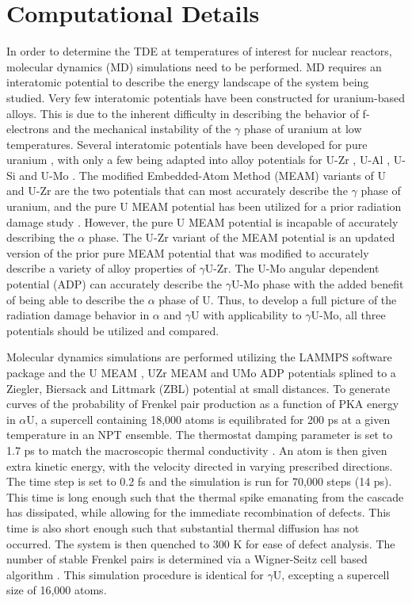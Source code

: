 \documentclass[review]{elsarticle}
\begin{document}
\section{Computational Details}
In order to determine the TDE at temperatures of interest for nuclear reactors, molecular dynamics (MD) \cite{abraham1986, allen1987} simulations need to be performed. MD requires an interatomic potential to describe the energy landscape of the system being studied. Very few interatomic potentials have been constructed for uranium-based alloys. This is due to the inherent difficulty in describing the behavior of f-electrons and the mechanical instability of the $\gamma$ phase of uranium at low temperatures. Several interatomic potentials have been developed for pure uranium \cite{beeler_meam, beelerASTM, fernandez2014, li2011, smirnova2012, li2012}, with only a few being adapted into alloy potentials for U-Zr \cite{moore2015}, U-Al \cite{pascuet2012}, U-Si \cite{beelerUSi} and U-Mo \cite{smirnovaUMo}. The modified Embedded-Atom Method (MEAM) variants of U and U-Zr \cite{beeler_meam, moore2015} are the two potentials that can most accurately describe the $\gamma$ phase of uranium, and the pure U MEAM potential \cite{beeler_meam} has been utilized for a prior radiation damage study \cite{miao2015}. However, the pure U MEAM potential is incapable of accurately describing the $\alpha$ phase. The U-Zr variant of the MEAM potential is an updated version of the prior pure MEAM potential that was modified to accurately describe a variety of alloy properties of $\gamma$U-Zr. The U-Mo angular dependent potential (ADP) \cite{smirnovaADP} can accurately describe the $\gamma$U-Mo phase with the added benefit of being able to describe the $\alpha$ phase of U. Thus, to develop a full picture of the radiation damage behavior in $\alpha$ and $\gamma$U with applicability to $\gamma$U-Mo, all three potentials should be utilized and compared.

Molecular dynamics simulations are performed utilizing the LAMMPS \cite{plimpton1995} software package and the U MEAM \cite{beeler_meam}, UZr MEAM \cite{moore2015} and UMo ADP \cite{smirnovaADP} potentials splined to a Ziegler, Biersack and Littmark (ZBL) \cite{zbl} potential at small distances. To generate curves of the probability of Frenkel pair production as a function of PKA energy in $\alpha$U, a supercell containing 18,000 atoms is equilibrated for 200 ps at a given temperature in an NPT ensemble. The thermostat damping parameter is set to 1.7 ps to match the macroscopic thermal conductivity \cite{lane2012}. An atom is then given extra kinetic energy, with the velocity directed in varying prescribed directions. The time step is set to 0.2 fs and the simulation is run for 70,000 steps (14 ps). This time is long enough such that the thermal spike emanating from the cascade has dissipated, while allowing for the immediate recombination of defects. This time is also short enough such that substantial thermal diffusion has not occurred. The system is then quenched to 300 K for ease of defect analysis. The number of stable Frenkel pairs is determined via a Wigner-Seitz cell based algorithm \cite{hayward2010}. This simulation procedure is identical for $\gamma$U, excepting a supercell size of 16,000 atoms. 
\end{document}
